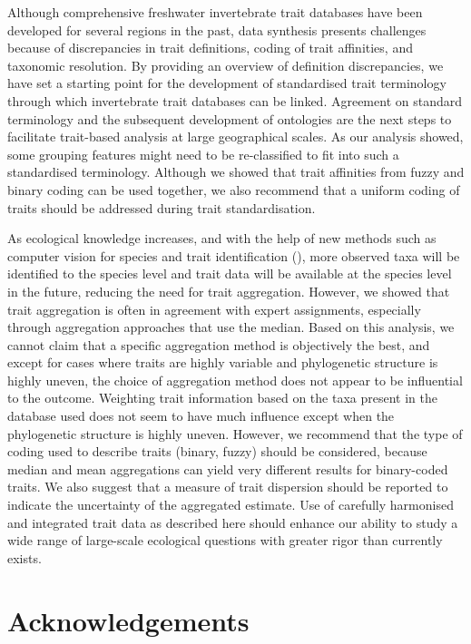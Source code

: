 \documentclass[12pt]{article}
\begin{document}
Although comprehensive freshwater invertebrate trait databases have been developed for several regions in the past, data synthesis presents challenges because of discrepancies in trait definitions, coding of trait affinities, and taxonomic resolution. By providing an overview of definition discrepancies, we have set a starting point for the development of standardised trait terminology through which invertebrate trait databases can be linked. Agreement on standard terminology and the subsequent development of ontologies are the next steps to facilitate trait-based analysis at large geographical scales. As our analysis showed, some grouping features might need to be re-classified to fit into such a standardised terminology. Although we showed that trait affinities from fuzzy and binary coding can be used together, we also recommend that a uniform coding of traits should be addressed during trait standardisation. 

As ecological knowledge increases, and with the help of new methods such as computer vision for species and trait identification (\cite{hoye_deep_2020}), more observed taxa will be identified to the species level and trait data will be available at the species level in the future, reducing the need for trait aggregation. However, we showed that trait aggregation is often in agreement with expert assignments, especially through aggregation approaches that use the median. Based on this analysis, we cannot claim that a specific aggregation method is objectively the best, and except for cases where traits are highly variable and phylogenetic structure is highly uneven, the choice of aggregation method does not appear to be influential to the outcome. Weighting trait information based on the taxa present in the database used does not seem to have much influence except when the phylogenetic structure is highly uneven. However, we recommend that the type of coding used to describe traits (binary, fuzzy) should be considered, because median and mean aggregations can yield very different results for binary-coded traits. We also suggest that a measure of trait dispersion should be reported to indicate the uncertainty of the aggregated estimate. Use of carefully harmonised and integrated trait data as described here should enhance our ability to study a wide range of large-scale ecological questions with greater rigor than currently exists.
 

\section*{Acknowledgements}
\end{document}

